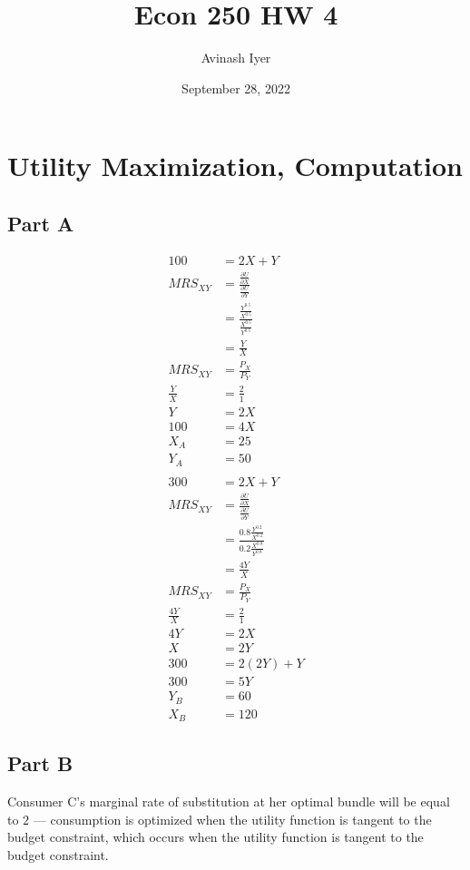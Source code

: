 \documentclass[8pt]{extarticle}
\title{Econ 250 HW 4}
\author{Avinash Iyer}
\date{September 28, 2022}
\begin{document}
{
\maketitle 
\section*{Utility Maximization, Computation}
\subsection*{Part A}
\begin{align*}
	100 &= 2X + Y \\
	MRS_{XY} &= \frac{\frac{\partial U}{\partial X}}{\frac{\partial U}{\partial Y}} \\
	&= \frac{\frac{Y^{0.5}}{X^{0.5}}}{\frac{X^{0.5}}{Y^{0.5}}} \\
	&= \frac{Y}{X} \\
	MRS_{XY} &= \frac{P_{X}}{P_{Y}} \\
	\frac{Y}{X} &= \frac{2}{1} \\
	Y &= 2X \\
	100 &= 4X \\
	X_{A} &= 25 \\
	Y_{A} &= 50 \\
	\\
	300 &= 2X + Y \\
	MRS_{XY} &= \frac{\frac{\partial U}{\partial X}}{\frac{\partial U}{\partial Y}} \\
	&= \frac{0.8 \frac{Y^{0.2}}{X^{0.2}}}{0.2 \frac{X^{0.8}}{Y^{0.8}}} \\
	&= \frac{4Y}{X} \\
	MRS_{XY} &= \frac{P_X}{P_Y} \\
	\frac{4Y}{X} &= \frac{2}{1} \\
	4Y &= 2X \\
	X &= 2Y \\
	300 &= 2(2Y) + Y \\
	300 &= 5Y \\
	Y_B &= 60 \\
	X_B &= 120
\end{align*}
\subsection*{Part B}
Consumer C's marginal rate of substitution at her optimal bundle will be equal to $2$ — consumption is optimized when the utility function is tangent to the budget constraint, which occurs when the utility function is tangent to the budget constraint.
}
\end{document}
